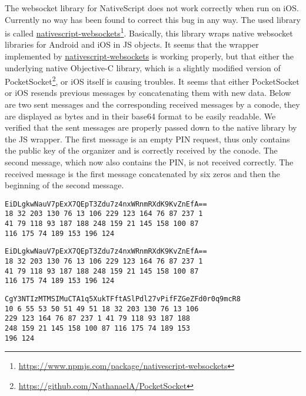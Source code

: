 \begin{description}[style=nextline]
\item[WebSocket Bug (iOS)] The websocket library for NativeScript does not work correctly when run on iOS. Currently no way has been found to correct this bug in any way. The used library is called \url{nativescript-websockets}\footnote{\url{https://www.npmjs.com/package/nativescript-websockets}}. Basically, this library wraps native websocket libraries for Android and iOS in JS objects. It seems that the wrapper implemented by \url{nativescript-websockets} is working properly, but that either the underlying native Objective-C library, which is a slightly modified version of PocketSocket\footnote{\url{https://github.com/NathanaelA/PocketSocket}}, or iOS itself is causing troubles. It seems that either PocketSocket or iOS resends previous messages by concatenating them with new data. Below are two sent messages and the corresponding received messages by a conode, they are displayed as bytes and in their base64 format to be easily readable. We verified that the sent messages are properly passed down to the native library by the JS wrapper. The first message is an empty PIN request, thus only contains the public key of the organizer and is correctly received by the conode. The second message, which now also contains the PIN, is not received correctly. The received message is the first message concatenated by six zeros and then the beginning of the second message.
\begin{description}[style=nextline]
\item[Sent]
\begin{lstlisting}
EiDLgkwNauV7pExX7QEpT3Zdu7z4nxWRnmRXdK9KvZnEfA==
18 32 203 130 76 13 106 229 123 164 76 87 237 1
41 79 118 93 187 188 248 159 21 145 158 100 87
116 175 74 189 153 196 124
\end{lstlisting}

\item[Received]
\begin{lstlisting}
EiDLgkwNauV7pExX7QEpT3Zdu7z4nxWRnmRXdK9KvZnEfA==
18 32 203 130 76 13 106 229 123 164 76 87 237 1
41 79 118 93 187 188 248 159 21 145 158 100 87
116 175 74 189 153 196 124
\end{lstlisting}
\end{description}
\begin{description}[style=nextline]
\item[Sent]
\begin{lstlisting}
CgY3NTIzMTMSIMuCTA1q5XukTFftASlPdl27vPifFZGeZFd0r0q9mcR8
10 6 55 53 50 51 49 51 18 32 203 130 76 13 106
229 123 164 76 87 237 1 41 79 118 93 187 188
248 159 21 145 158 100 87 116 175 74 189 153
196 124
\end{lstlisting}


\end{description}
\end{description}
